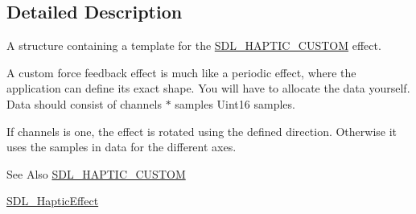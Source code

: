\subsection{Detailed Description}
A structure containing a template for the \hyperlink{_s_d_l__haptic_8h_a8a18c4de1076ac9bebd718329d16db29}{S\-D\-L\-\_\-\-H\-A\-P\-T\-I\-C\-\_\-\-C\-U\-S\-T\-O\-M} effect. 

A custom force feedback effect is much like a periodic effect, where the application can define its exact shape. You will have to allocate the data yourself. Data should consist of channels $\ast$ samples Uint16 samples.

If channels is one, the effect is rotated using the defined direction. Otherwise it uses the samples in data for the different axes.

\begin{DoxySeeAlso}{See Also}
\hyperlink{_s_d_l__haptic_8h_a8a18c4de1076ac9bebd718329d16db29}{S\-D\-L\-\_\-\-H\-A\-P\-T\-I\-C\-\_\-\-C\-U\-S\-T\-O\-M} 

\hyperlink{union_s_d_l___haptic_effect}{S\-D\-L\-\_\-\-Haptic\-Effect} 
\end{DoxySeeAlso}


